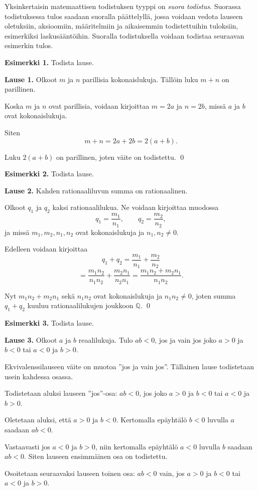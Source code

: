 Yksinkertaisin matemaattisen todistuksen tyyppi on {\em suora todistus}. Suorassa todistuksessa tulos saadaan suoralla päättelyllä, jossa voidaan vedota lauseen oletuksiin, aksioomiin, määritelmiin ja aikaisemmin todistettuihin tuloksiin, esimerkiksi laskusääntöihin. Suoralla todistuksella voidaan todistaa seuraavan esimerkin tulos.

{\bf Esimerkki 1.} Todista lause.

{\bf Lause 1.} Olkoot $m$ ja $n$ parillisia kokonaislukuja. Tällöin luku $m+n$ on parillinen.

\proof
Koska $m$ ja $n$ ovat parillisia, voidaan kirjoittaa $m=2a$ ja $n=2b$, missä $a$ ja $b$ ovat kokonaislukuja.

Siten
\[
m+n =2a+2b = 2(a+b).
\]

Luku $2(a+b)$ on parillinen, joten väite on todistettu.
\qed

{\bf Esimerkki 2.} Todista lause.

{\bf Lause 2.} Kahden rationaaliluvun summa on rationaalinen.

\proof
Olkoot $q_1$ ja $q_2$ kaksi rationaalilukua. Ne voidaan kirjoittaa muodossa
\[
q_1=\frac{m_1}{n_1},\qquad 
q_2=\frac{m_2}{n_2},
\]
ja missä $m_1,m_2,n_1,n_2$ ovat kokonaislukuja ja $n_1,n_2\neq 0$.

Edelleen voidaan kirjoittaa
\[
q_1+q_2 = \frac{m_1}{n_1}+ \frac{m_2}{n_2}
\]
\[
= \frac{m_1 n_2}{n_1 n_2}+ \frac{m_2 n_1}{n_2 n_1} = \frac{m_1n_2 + m_2 n_1}{n_1 n_2}.
\]

Nyt $m_1n_2 + m_2 n_1$ sekä $n_1 n_2$ ovat kokonaislukuja ja $n_1 n_2\neq 0$, joten summa $q_1+q_2$ kuuluu rationaalilukujen joukkoon $\mathbb{Q}$.
\qed

{\bf Esimerkki 3.} Todista lause.

{\bf Lause 3.} Olkoot $a$ ja $b$ reaalilukuja. Tulo $ab<0$, jos ja vain jos joko $a>0$ ja $b<0$ tai $a<0$ ja $b>0$.

\proof
Ekvivalenssilauseen väite on muotoa ''jos ja vain jos''. Tällainen lause todistetaan usein kahdessa osassa.

Todistetaan aluksi lauseen ''jos''-osa: $ab<0$, jos joko $a>0$ ja $b<0$ tai $a<0$ ja $b>0$.

Oletetaan aluksi, että $a>0$ ja $b<0$. Kertomalla epäyhtälö $b<0$ luvulla $a$ saadaan $ab<0$.

Vastaavasti jos $a<0$ ja $b>0$, niin kertomalla epäyhtälö $a<0$ luvulla $b$ saadaan $ab<0$. Siten lauseen ensimmäinen osa on todistettu.

Osoitetaan seuraavaksi lauseen toinen osa: $ab<0$ vain, jos $a>0$ ja $b<0$ tai $a<0$ ja $b>0$.

